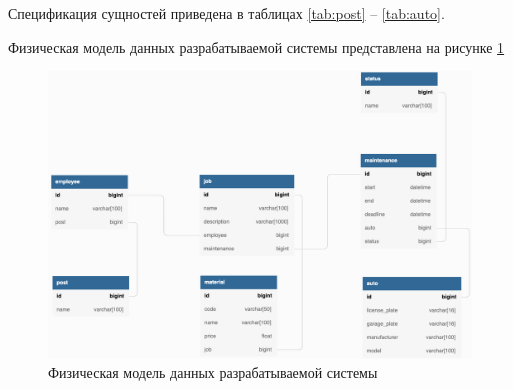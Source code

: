 \documentclass[../nirs.tex]{subfiles}
\begin{document}
Спецификация сущностей приведена в таблицах \ref{tab:post} --
\ref{tab:auto}.








Физическая модель данных разрабатываемой системы представлена на рисунке
\ref{fig:3_1_db_physical}

\clearpage
\begin{landscape}

\begin{figure}[H]
	\centering
	\includegraphics[keepaspectratio,width=\paperwidth]{./images/3_1_db_physical.png}
	\caption{Физическая модель данных разрабатываемой системы}
	\label{fig:3_1_db_physical}
\end{figure}

\end{landscape}
\clearpage
\end{document}
